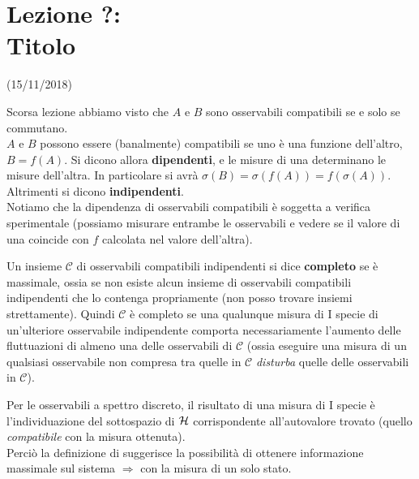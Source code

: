 \documentclass[../../FisicaTeorica.tex]{subfiles}
\begin{document}
\section{Lezione ?:\\ \large{Titolo}}
\vspace{-1em}
\begin{center}
    \small{(15/11/2018)}
\end{center}

Scorsa lezione abbiamo visto che $A$ e $B$ sono osservabili compatibili se e solo se commutano.\\
$A$ e $B$ possono essere (banalmente) compatibili se uno è una funzione dell'altro, $B=f(A)$. Si dicono allora \textbf{dipendenti}, e le misure di una determinano le misure dell'altra.
In particolare si avrà $\sigma(B)=\sigma(f(A))=f(\sigma(A))$.\\
Altrimenti si dicono \textbf{indipendenti}.\\
Notiamo che la dipendenza di osservabili compatibili è soggetta a verifica sperimentale (possiamo misurare entrambe le osservabili e vedere se il valore di una coincide con $f$ calcolata nel valore dell'altra).\\
\begin{dfn}
Un insieme $\mathcal{C}$ di osservabili compatibili indipendenti si dice \textbf{completo} se è massimale, ossia se non esiste alcun insieme di osservabili compatibili indipendenti che lo contenga propriamente (non posso trovare insiemi  strettamente). Quindi $\mathcal{C}$ è completo se una qualunque misura di I specie di un'ulteriore osservabile indipendente comporta necessariamente l'aumento delle fluttuazioni di almeno una delle osservabili di $\mathcal{C}$ (ossia eseguire una misura di un qualsiasi osservabile non compresa tra quelle in $\mathcal{C}$ \textit{disturba} quelle delle osservabili in $\mathcal{C}$).
\end{dfn}
Per le osservabili a spettro discreto, il risultato di una misura di I specie è l'individuazione del sottospazio di $\mathcal{H}$ corrispondente all'autovalore trovato (quello \textit{compatibile} con la misura ottenuta).\\
Perciò la definizione di
 suggerisce la possibilità di ottenere informazione massimale sul sistema $\Rightarrow $ con la misura di un solo stato.\\
\end{document}
